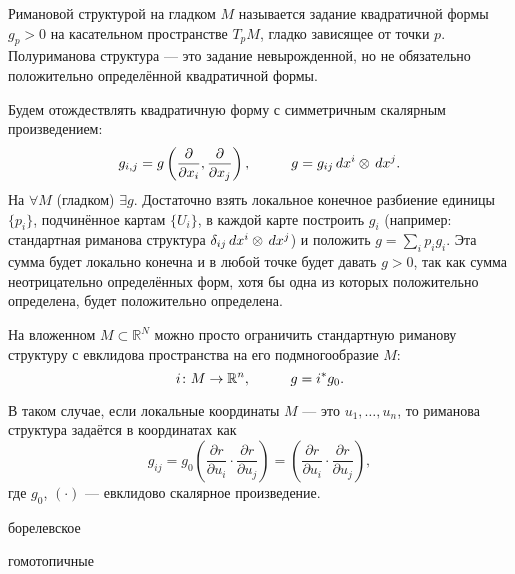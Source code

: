 \begin{to_def}
	Римановой структурой на гладком $M$ называется задание квадратичной формы $g_p >0$ на касательном пространстве $T_p M$, гладко зависящее от точки $p$. Полуриманова структура --- это задание невырожденной, но не обязательно положительно определённой квадратичной формы.
\end{to_def}

Будем отождествлять квадратичную форму с симметричным скалярным произведением:
\begin{equation*}
	g_{i,j} = g \left(\frac{\partial}{\partial x_i}, \frac{\partial}{\partial x_j}\right),
	\hspace*{1 cm}
	g = g_{i j} \, d x^i \otimes \, d x^j.
\end{equation*}
На $\forall M$ (гладком) $\exists g$. Достаточно взять локальное конечное разбиение единицы $\{p_i\}$, подчинённое картам $\{U_i\}$, в каждой карте построить $g_i$ (например: стандартная риманова структура $\delta_{i j} \, d x^i \otimes \, d x^j $) и положить $g = \sum_i p_i g_i$.
Эта сумма будет локально конечна и в любой точке будет давать $g>0$, так как сумма неотрицательно определённых форм, хотя бы одна из которых положительно определена, будет положительно определена.

На вложенном $M \subset \mathbb{R}^N$ можно просто ограничить стандартную риманову структуру с евклидова пространства на его подмногообразие $M$:
\begin{equation*}
	 i\colon M \rightarrow \mathbb{R}^n, \hspace*{1 cm}  
	 g = i^* g_0.
\end{equation*}

В таком случае, если локальные координаты $M$ --- это $u_{1}, \ldots, u_n $, то риманова структура задаётся в координатах как
\begin{equation}
	g_{i j} = g_0\left(\frac{\partial r}{\partial u_i} \cdot \frac{\partial r}{\partial u_j}\right) = \left(\frac{\partial r}{\partial u_i} \cdot \frac{\partial r}{\partial u_j}\right),	
\end{equation}
где $g_{0}$, $(\cdot)$ --- евклидово скалярное произведение.

борелевское

гомотопичные 